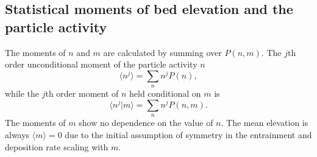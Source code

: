 \subsection{Statistical moments of bed elevation and the particle activity}
\label{sec:elemom}

The moments of $n$ and $m$ are calculated by summing over $P(n,m)$. 
The $j$th order unconditional moment of the particle activity $n$ \DIFdelbegin {}\DIFdelend \DIFaddbegin {}\DIFaddend \begin{equation} \langle n^j \rangle = \sum_{n}n^jP(n),\end{equation}
while the $j$th order moment of $n$ held conditional on $m$ is
\begin{equation} \langle n^j|m \rangle = \sum_{n}n^j P(n,m) .\end{equation}
The moments of $m$ show no dependence on the value of $n$. 
The mean elevation is always $\langle m \rangle = 0 $ due to the initial assumption of symmetry in the entrainment and deposition rate scaling with $m$. 
\DIFdelbegin %
{%
}
\DIFdelend \DIFaddbegin 



